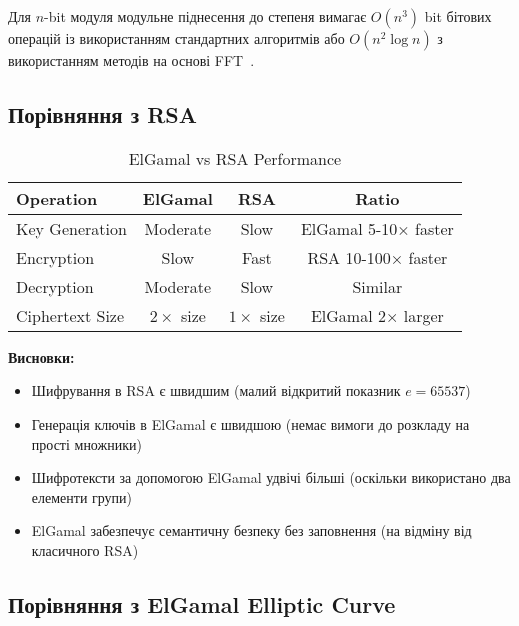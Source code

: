 Для $n$-bit модуля модульне піднесення до степеня вимагає $O(n^3)$ bit бітових операцій із використанням стандартних 
алгоритмів або $O(n^2 \log n)$ з використанням методів на основі FFT~\cite{menezes1996handbook}.

\subsection{Порівняння з RSA}

\newpage %

\begin{table}[ht]
    \centering
    \begin{tabular}{|l|c|c|c|}
        \hline
        \textbf{Operation} & \textbf{ElGamal} & \textbf{RSA}    & \textbf{Ratio}       \\
        \hline
        Key Generation     & Moderate         & Slow            & ElGamal 5-10× faster \\
        Encryption         & Slow             & Fast            & RSA 10-100× faster   \\
        Decryption         & Moderate         & Slow            & Similar              \\
        Ciphertext Size    & $2 \times$ size  & $1 \times$ size & ElGamal 2× larger    \\
        \hline
    \end{tabular}
    \caption{ElGamal vs RSA Performance}
\end{table}

\textbf{Висновки:}
\begin{itemize}
    \item Шифрування в RSA є швидшим (малий відкритий показник $e = 65537$)
    \item Генерація ключів в ElGamal є швидшою (немає вимоги до розкладу на прості множники)
    \item Шифротексти за допомогою ElGamal удвічі більші (оскільки використано два елементи групи)
    \item ElGamal забезпечує семантичну безпеку без заповнення (на відміну від класичного RSA)
\end{itemize}

\subsection{Порівняння з ElGamal Elliptic Curve}

